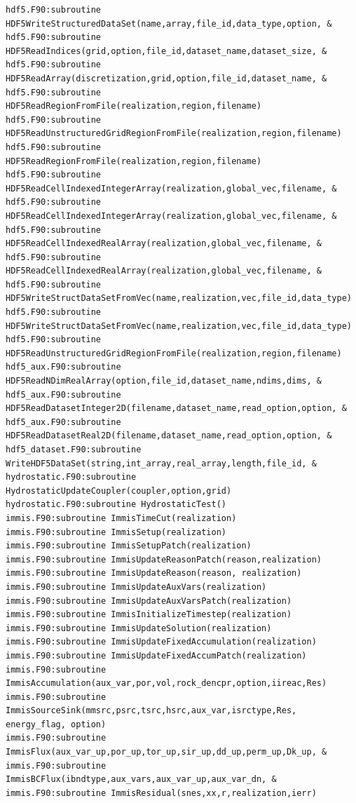 \documentclass[12pt]{article}
\begin{document}
\begin{verbatim}
hdf5.F90:subroutine HDF5WriteStructuredDataSet(name,array,file_id,data_type,option, &
hdf5.F90:subroutine HDF5ReadIndices(grid,option,file_id,dataset_name,dataset_size, &
hdf5.F90:subroutine HDF5ReadArray(discretization,grid,option,file_id,dataset_name, &
hdf5.F90:subroutine HDF5ReadRegionFromFile(realization,region,filename)
hdf5.F90:subroutine HDF5ReadUnstructuredGridRegionFromFile(realization,region,filename)
hdf5.F90:subroutine HDF5ReadRegionFromFile(realization,region,filename)
hdf5.F90:subroutine HDF5ReadCellIndexedIntegerArray(realization,global_vec,filename, &
hdf5.F90:subroutine HDF5ReadCellIndexedIntegerArray(realization,global_vec,filename, &
hdf5.F90:subroutine HDF5ReadCellIndexedRealArray(realization,global_vec,filename, &
hdf5.F90:subroutine HDF5ReadCellIndexedRealArray(realization,global_vec,filename, &
hdf5.F90:subroutine HDF5WriteStructDataSetFromVec(name,realization,vec,file_id,data_type)
hdf5.F90:subroutine HDF5WriteStructDataSetFromVec(name,realization,vec,file_id,data_type)
hdf5.F90:subroutine HDF5ReadUnstructuredGridRegionFromFile(realization,region,filename)
hdf5_aux.F90:subroutine HDF5ReadNDimRealArray(option,file_id,dataset_name,ndims,dims, &
hdf5_aux.F90:subroutine HDF5ReadDatasetInteger2D(filename,dataset_name,read_option,option, &
hdf5_aux.F90:subroutine HDF5ReadDatasetReal2D(filename,dataset_name,read_option,option, &
hdf5_dataset.F90:subroutine WriteHDF5DataSet(string,int_array,real_array,length,file_id, &
hydrostatic.F90:subroutine HydrostaticUpdateCoupler(coupler,option,grid)
hydrostatic.F90:subroutine HydrostaticTest()
immis.F90:subroutine ImmisTimeCut(realization)
immis.F90:subroutine ImmisSetup(realization)
immis.F90:subroutine ImmisSetupPatch(realization)
immis.F90:subroutine ImmisUpdateReasonPatch(reason,realization)
immis.F90:subroutine ImmisUpdateReason(reason, realization)
immis.F90:subroutine ImmisUpdateAuxVars(realization)
immis.F90:subroutine ImmisUpdateAuxVarsPatch(realization)
immis.F90:subroutine ImmisInitializeTimestep(realization)
immis.F90:subroutine ImmisUpdateSolution(realization)
immis.F90:subroutine ImmisUpdateFixedAccumulation(realization)
immis.F90:subroutine ImmisUpdateFixedAccumPatch(realization)
immis.F90:subroutine ImmisAccumulation(aux_var,por,vol,rock_dencpr,option,iireac,Res)
immis.F90:subroutine ImmisSourceSink(mmsrc,psrc,tsrc,hsrc,aux_var,isrctype,Res, energy_flag, option)
immis.F90:subroutine ImmisFlux(aux_var_up,por_up,tor_up,sir_up,dd_up,perm_up,Dk_up, &
immis.F90:subroutine ImmisBCFlux(ibndtype,aux_vars,aux_var_up,aux_var_dn, &
immis.F90:subroutine ImmisResidual(snes,xx,r,realization,ierr)

\end{verbatim}
\end{document}
